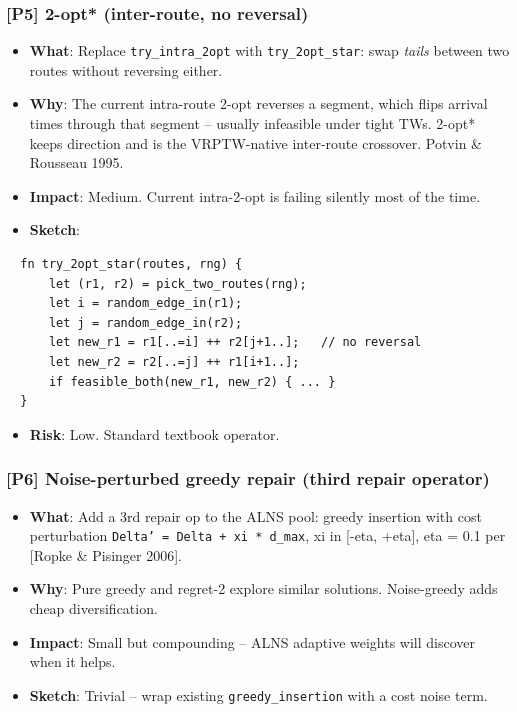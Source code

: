 \documentclass[twocolumn,10pt,letterpaper]{article}
\begin{document}
\subsubsection{[P5] 2-opt* (inter-route, no reversal)}
\begin{itemize}
\setlength{\itemsep}{0pt}
\setlength{\parskip}{0pt}
  \item \textbf{What}: Replace \texttt{try\_intra\_2opt} with \texttt{try\_2opt\_star}: swap \textit{tails} between two routes without reversing either.
  \item \textbf{Why}: The current intra-route 2-opt reverses a segment, which flips arrival times through that segment -- usually infeasible under tight TWs. 2-opt* keeps direction and is the VRPTW-native inter-route crossover. Potvin \& Rousseau 1995.
  \item \textbf{Impact}: Medium. Current intra-2-opt is failing silently most of the time.
  \item \textbf{Sketch}:
\end{itemize}
\begin{lstlisting}
  fn try_2opt_star(routes, rng) {
      let (r1, r2) = pick_two_routes(rng);
      let i = random_edge_in(r1);
      let j = random_edge_in(r2);
      let new_r1 = r1[..=i] ++ r2[j+1..];   // no reversal
      let new_r2 = r2[..=j] ++ r1[i+1..];
      if feasible_both(new_r1, new_r2) { ... }
  }
\end{lstlisting}
\begin{itemize}
\setlength{\itemsep}{0pt}
\setlength{\parskip}{0pt}
  \item \textbf{Risk}: Low. Standard textbook operator.
\end{itemize}

\subsubsection{[P6] Noise-perturbed greedy repair (third repair operator)}
\begin{itemize}
\setlength{\itemsep}{0pt}
\setlength{\parskip}{0pt}
  \item \textbf{What}: Add a 3rd repair op to the ALNS pool: greedy insertion with cost perturbation \texttt{Delta' = Delta + xi * d\_max}, xi in [-eta, +eta], eta = 0.1 per [Ropke \& Pisinger 2006].
  \item \textbf{Why}: Pure greedy and regret-2 explore similar solutions. Noise-greedy adds cheap diversification.
  \item \textbf{Impact}: Small but compounding -- ALNS adaptive weights will discover when it helps.
  \item \textbf{Sketch}: Trivial -- wrap existing \texttt{greedy\_insertion} with a cost noise term.
\end{itemize}
\end{document}
